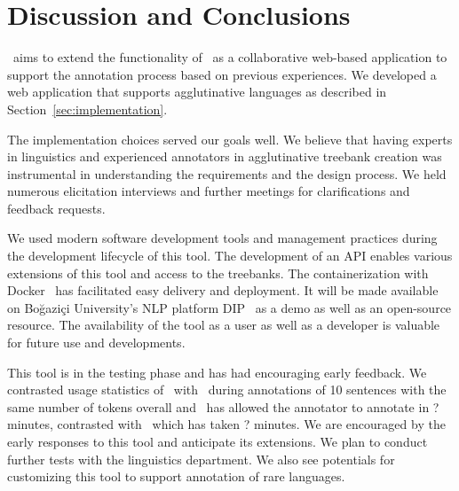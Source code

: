\section{Discussion and Conclusions}
\label{sec:discussion}

\boatvtwo\ aims to  extend the functionality of \boatvone\ as a collaborative web-based application to support the annotation process based on previous experiences.
We developed a web application that supports agglutinative languages as described in Section~\ref{sec:implementation}.

The implementation choices served our goals well.
We believe that having experts in linguistics and experienced annotators in agglutinative treebank creation was instrumental in understanding the requirements and the design process.
We held numerous elicitation interviews and further meetings for clarifications and feedback requests.

We used modern software development tools and management practices during the development lifecycle of this tool.
The development of an API enables various extensions of this tool and access to the treebanks.
The containerization with Docker~\cite{docker} has facilitated easy delivery and deployment.
It will be made available on Boğaziçi University's NLP platform DIP~\cite{DIP} as a demo as well as an open-source resource.
The availability of the tool as a user as well as a developer is valuable for future use and developments.

This tool is in the testing phase and has had encouraging early feedback.
We contrasted usage statistics of \boatvone\ with \boatvtwo\ during annotations of 10 sentences with the same number of tokens overall and \boatvtwo\ has allowed the annotator to annotate in ? minutes, contrasted with \boatvone\ which has taken ? minutes.
We are encouraged by the early responses to this tool and anticipate its extensions.
We plan to conduct further tests with the linguistics department.
We also see potentials for customizing this tool to support annotation of rare languages.
